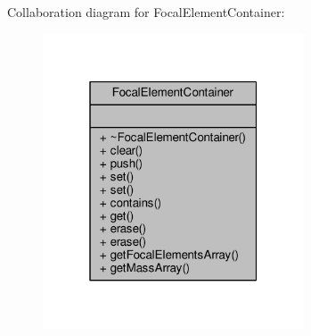Collaboration diagram for Focal\+Element\+Container\+:\nopagebreak
\begin{figure}[H]
\begin{center}
\leavevmode
\includegraphics[width=220pt]{classFocalElementContainer__coll__graph}
\end{center}
\end{figure}
